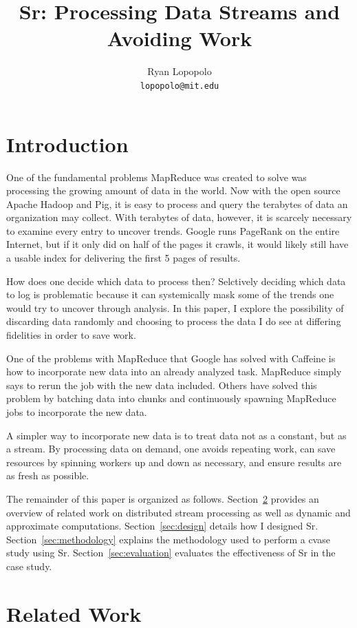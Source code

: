 \documentclass[12pt]{article}
\title{Sr: Processing Data Streams and Avoiding Work}
\author{Ryan Lopopolo\\
\texttt{lopopolo@mit.edu}}
\begin{document}
\twocolumn
\maketitle

\section{Introduction}
\label{sec:intro}
One of the fundamental problems MapReduce was created to solve was processing
the growing amount of data in the world. Now with the open source Apache Hadoop
and Pig, it is easy to process and query the terabytes of data an organization
may collect. With terabytes of data, however, it is scarcely necessary to examine
every entry to uncover trends. Google runs PageRank on the entire Internet, but if
it only did on half of the pages it crawls, it would likely still have a usable
index for delivering the first 5 pages of results.

How does one decide which data to process then? Selctively deciding which data to
log is problematic because it can systemically mask some of the trends one would
try to uncover through analysis. In this paper, I explore the possibility of
discarding data randomly and choosing to process the data I do see at differing
fidelities in order to save work.

One of the problems with MapReduce that Google has solved with Caffeine is how to
incorporate new data into an already analyzed task. MapReduce simply says to rerun
the job with the new data included. Others have solved this problem by batching data
into chunks and continuously spawning MapReduce jobs to incorporate the new data.

A simpler way to incorporate new data is to treat data not as a constant, but as a
stream. By processing data on demand, one avoids repeating work, can save resources
by spinning workers up and down as necessary, and ensure results are as fresh as possible.

The remainder of this paper is organized as follows. Section~\ref{sec:relwork} provides
an overview of related work on distributed stream processing as well as dynamic and
approximate computations. Section~\ref{sec:design} details how I designed Sr.
Section~\ref{sec:methodology} explains the methodology used to perform a cvase study
using Sr. Section~\ref{sec:evaluation} evaluates the effectiveness of Sr in the case study.

\section{Related Work}
\label{sec:relwork}
\end{document}

